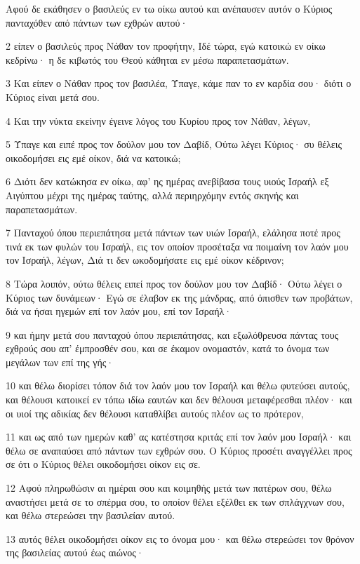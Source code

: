 \par Αφού δε εκάθησεν ο βασιλεύς εν τω οίκω αυτού και ανέπαυσεν αυτόν ο Κύριος πανταχόθεν από πάντων των εχθρών αυτού·
\par 2 είπεν ο βασιλεύς προς Νάθαν τον προφήτην, Ιδέ τώρα, εγώ κατοικώ εν οίκω κεδρίνω· η δε κιβωτός του Θεού κάθηται εν μέσω παραπετασμάτων.
\par 3 Και είπεν ο Νάθαν προς τον βασιλέα, Ύπαγε, κάμε παν το εν καρδία σου· διότι ο Κύριος είναι μετά σου.
\par 4 Και την νύκτα εκείνην έγεινε λόγος του Κυρίου προς τον Νάθαν, λέγων,
\par 5 Ύπαγε και ειπέ προς τον δούλον μου τον Δαβίδ, Ούτω λέγει Κύριος· συ θέλεις οικοδομήσει εις εμέ οίκον, διά να κατοικώ;
\par 6 Διότι δεν κατώκησα εν οίκω, αφ' ης ημέρας ανεβίβασα τους υιούς Ισραήλ εξ Αιγύπτου μέχρι της ημέρας ταύτης, αλλά περιηρχόμην εντός σκηνής και παραπετασμάτων.
\par 7 Πανταχού όπου περιεπάτησα μετά πάντων των υιών Ισραήλ, ελάλησα ποτέ προς τινά εκ των φυλών του Ισραήλ, εις τον οποίον προσέταξα να ποιμαίνη τον λαόν μου τον Ισραήλ, λέγων, Διά τι δεν ωκοδομήσατε εις εμέ οίκον κέδρινον;
\par 8 Τώρα λοιπόν, ούτω θέλεις ειπεί προς τον δούλον μου τον Δαβίδ· Ούτω λέγει ο Κύριος των δυνάμεων· Εγώ σε έλαβον εκ της μάνδρας, από όπισθεν των προβάτων, διά να ήσαι ηγεμών επί τον λαόν μου, επί τον Ισραήλ·
\par 9 και ήμην μετά σου πανταχού όπου περιεπάτησας, και εξωλόθρευσα πάντας τους εχθρούς σου απ' έμπροσθέν σου, και σε έκαμον ονομαστόν, κατά το όνομα των μεγάλων των επί της γής·
\par 10 και θέλω διορίσει τόπον διά τον λαόν μου τον Ισραήλ και θέλω φυτεύσει αυτούς, και θέλουσι κατοικεί εν τόπω ιδίω εαυτών και δεν θέλουσι μεταφέρεσθαι πλέον· και οι υιοί της αδικίας δεν θέλουσι καταθλίβει αυτούς πλέον ως το πρότερον,
\par 11 και ως από των ημερών καθ' ας κατέστησα κριτάς επί τον λαόν μου Ισραήλ· και θέλω σε αναπαύσει από πάντων των εχθρών σου. Ο Κύριος προσέτι αναγγέλλει προς σε ότι ο Κύριος θέλει οικοδομήσει οίκον εις σε.
\par 12 Αφού πληρωθώσιν αι ημέραι σου και κοιμηθής μετά των πατέρων σου, θέλω αναστήσει μετά σε το σπέρμα σου, το οποίον θέλει εξέλθει εκ των σπλάγχνων σου, και θέλω στερεώσει την βασιλείαν αυτού.
\par 13 αυτός θέλει οικοδομήσει οίκον εις το όνομα μου· και θέλω στερεώσει τον θρόνον της βασιλείας αυτού έως αιώνος·

